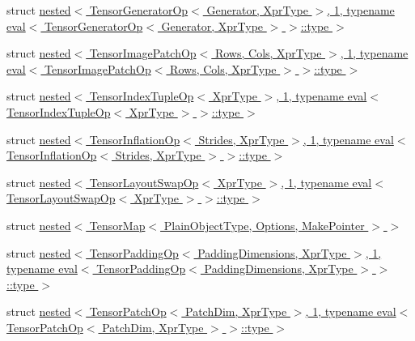 \begin{DoxyCompactItemize}
\item 
struct \hyperlink{struct_eigen_1_1internal_1_1nested_3_01_tensor_generator_op_3_01_generator_00_01_xpr_type_01_4_0384769220adcc2cd0a85c8ada993f368}{nested$<$ Tensor\+Generator\+Op$<$ Generator, Xpr\+Type $>$, 1, typename eval$<$ Tensor\+Generator\+Op$<$ Generator, Xpr\+Type $>$ $>$\+::type $>$}
\item 
struct \hyperlink{struct_eigen_1_1internal_1_1nested_3_01_tensor_image_patch_op_3_01_rows_00_01_cols_00_01_xpr_typbdbaf7e5a7b5b77870e0e3f45395b2a8}{nested$<$ Tensor\+Image\+Patch\+Op$<$ Rows, Cols, Xpr\+Type $>$, 1, typename eval$<$ Tensor\+Image\+Patch\+Op$<$ Rows, Cols, Xpr\+Type $>$ $>$\+::type $>$}
\item 
struct \hyperlink{struct_eigen_1_1internal_1_1nested_3_01_tensor_index_tuple_op_3_01_xpr_type_01_4_00_011_00_01typ5b5b3f337e89a8fcbdd9fda09242c5e4}{nested$<$ Tensor\+Index\+Tuple\+Op$<$ Xpr\+Type $>$, 1, typename eval$<$ Tensor\+Index\+Tuple\+Op$<$ Xpr\+Type $>$ $>$\+::type $>$}
\item 
struct \hyperlink{struct_eigen_1_1internal_1_1nested_3_01_tensor_inflation_op_3_01_strides_00_01_xpr_type_01_4_00_eeee4fbc81465d4717490c737a712fae}{nested$<$ Tensor\+Inflation\+Op$<$ Strides, Xpr\+Type $>$, 1, typename eval$<$ Tensor\+Inflation\+Op$<$ Strides, Xpr\+Type $>$ $>$\+::type $>$}
\item 
struct \hyperlink{struct_eigen_1_1internal_1_1nested_3_01_tensor_layout_swap_op_3_01_xpr_type_01_4_00_011_00_01typ6254865c69b0d0586b21be5155c49fd7}{nested$<$ Tensor\+Layout\+Swap\+Op$<$ Xpr\+Type $>$, 1, typename eval$<$ Tensor\+Layout\+Swap\+Op$<$ Xpr\+Type $>$ $>$\+::type $>$}
\item 
struct \hyperlink{struct_eigen_1_1internal_1_1nested_3_01_tensor_map_3_01_plain_object_type_00_01_options_00_01_make_pointer_01_4_01_4}{nested$<$ Tensor\+Map$<$ Plain\+Object\+Type, Options, Make\+Pointer $>$ $>$}
\item 
struct \hyperlink{struct_eigen_1_1internal_1_1nested_3_01_tensor_padding_op_3_01_padding_dimensions_00_01_xpr_type5274dc122ae52b0a0b0b3a8c02d9f9cb}{nested$<$ Tensor\+Padding\+Op$<$ Padding\+Dimensions, Xpr\+Type $>$, 1, typename eval$<$ Tensor\+Padding\+Op$<$ Padding\+Dimensions, Xpr\+Type $>$ $>$\+::type $>$}
\item 
struct \hyperlink{struct_eigen_1_1internal_1_1nested_3_01_tensor_patch_op_3_01_patch_dim_00_01_xpr_type_01_4_00_017d8350baeaabc5f17d005b7a04cfaf28}{nested$<$ Tensor\+Patch\+Op$<$ Patch\+Dim, Xpr\+Type $>$, 1, typename eval$<$ Tensor\+Patch\+Op$<$ Patch\+Dim, Xpr\+Type $>$ $>$\+::type $>$}

\end{DoxyCompactItemize}

